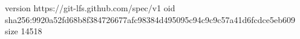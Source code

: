 version https://git-lfs.github.com/spec/v1
oid sha256:9920a52fd68b8f384726677afc98384d495095c94c9c9c57a41d6fcdce5eb609
size 14518
